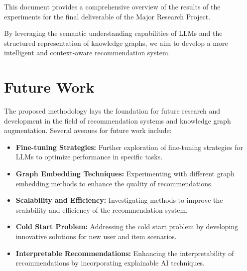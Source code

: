 \documentclass{article}
\begin{document}
This document provides a comprehensive overview of the results of the experiments
for the final deliverable of the Major Research Project.

By leveraging the semantic understanding capabilities of LLMs and the
structured representation of knowledge graphs, we aim to develop a more
intelligent and context-aware recommendation system.

\section{Future Work}

The proposed methodology lays the foundation for future research and
development in the field of recommendation systems and knowledge graph
augmentation. Several avenues for future work include:

\begin{itemize}
      \item \textbf{Fine-tuning Strategies:} Further exploration of fine-tuning
            strategies for LLMs to optimize performance in specific tasks.
      \item \textbf{Graph Embedding Techniques:} Experimenting with different
            graph embedding methods to enhance the quality of recommendations.
      \item \textbf{Scalability and Efficiency:} Investigating methods to
            improve the scalability and efficiency of the recommendation system.
      \item \textbf{Cold Start Problem:} Addressing the cold start problem by
            developing innovative solutions for new user and item scenarios.
      \item \textbf{Interpretable Recommendations:} Enhancing the
            interpretability of recommendations by incorporating explainable AI
            techniques.
\end{itemize}


\printbibliography
\clearpage

\appendix
\end{document}
